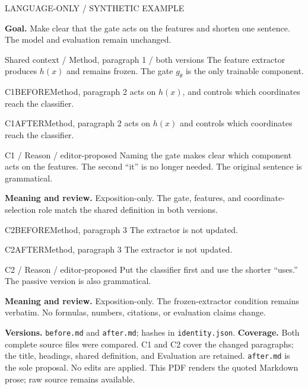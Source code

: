 \documentclass[11pt]{article}
\begin{document}
{\small\color{rcMuted}LANGUAGE-ONLY / SYNTHETIC EXAMPLE}

\textbf{Goal.} Make clear that the gate acts on the features and shorten one sentence.
The model and evaluation remain unchanged.

\begin{rcContext}{Shared context / Method, paragraph 1 / both versions}
The feature extractor produces $h(x)$ and remains frozen. The gate $g_\theta$ is the only trainable component.
\end{rcContext}

\begin{rcPassage}{C1}{BEFORE}{Method, paragraph 2}
 acts on $h(x)$, and  controls which coordinates reach the classifier.
\end{rcPassage}
\begin{rcPassage}{C1}{AFTER}{Method, paragraph 2}
 acts on $h(x)$ and controls which coordinates reach the classifier.
\end{rcPassage}
\ifrcannotations
\begin{rcContext}{C1 / Reason / editor-proposed}
Naming the gate makes clear which component acts on the features. The
second ``it'' is no longer needed. The original sentence is grammatical.
\end{rcContext}
\fi
{\small\textbf{Meaning and review.} Exposition-only. The gate, features, and coordinate-selection role match the shared
definition in both versions.}

\begin{rcPassage}{C2}{BEFORE}{Method, paragraph 3}
 The extractor is not updated.
\end{rcPassage}
\begin{rcPassage}{C2}{AFTER}{Method, paragraph 3}
 The extractor is not updated.
\end{rcPassage}
\ifrcannotations
\begin{rcContext}{C2 / Reason / editor-proposed}
Put the classifier first and use the shorter ``uses.'' The passive
version is also grammatical.
\end{rcContext}
\fi
{\small\textbf{Meaning and review.} Exposition-only. The frozen-extractor condition
remains verbatim. No formulas, numbers, citations, or evaluation claims change.}

{\footnotesize\color{rcMuted}\textbf{Versions.} \texttt{before.md} and
\texttt{after.md}; hashes in \texttt{identity.json}.
\textbf{Coverage.} Both complete source files were compared. C1 and C2 cover
the changed paragraphs; the title, headings, shared definition, and Evaluation
are retained. \texttt{after.md} is the sole proposal. No edits are applied.
This PDF renders the quoted Markdown prose; raw source remains available.}
\end{document}
